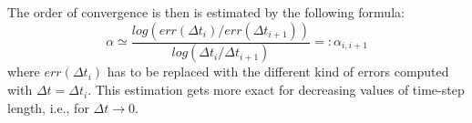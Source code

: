 
 The order of convergence is then is estimated by the following formula:
\begin{equation}\label{eq:order_est}
    \alpha \simeq \frac{log(err(\Delta t_i) / err(\Delta t_{i+1}))}{log(\Delta t_i/\Delta t_{i+1})} =: \alpha_{i,i+1}
\end{equation}
where $err(\Delta t_i)$ has to be replaced with the different kind of errors computed with $\Delta t = \Delta t _i$. This estimation gets more exact for decreasing values of time-step length, i.e., for $\Delta t \rightarrow 0$.


